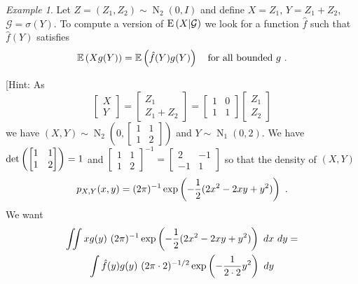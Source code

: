\documentclass[12pt,a4paper]{amsart}
\newcommand{\gaussian}[3]{\operatorname{N}_{#1}\left(#2,#3\right)}
\theoremstyle{plain}%
\theoremstyle{definition}
\theoremstyle{remark}
\newtheorem{example}{Example}
\begin{document}
\begin{example}
Let $Z = (Z_1,Z_2) \sim \gaussian 2 0 I$ and define $X = Z_1$, $Y = Z_1+ Z_2$, $\mathcal G = \sigma(Y)$. To compute a version of $\operatorname{E}\left(X \middle| \mathcal G\right)$ we look for a function $\hat f$ such that $\hat f(Y)$ satisfies
\begin{equation*}
  \expectof{X g(Y)} = \expectof{\hat f(Y) g(Y)} \quad \text{for all bounded $g$} \ .
\end{equation*}

[Hint: As 
\begin{equation*}
  \begin{bmatrix}
  X \\ Y
\end{bmatrix} =
\begin{bmatrix}
  Z_1 \\ Z_1 + Z_2
\end{bmatrix} =
\begin{bmatrix}
  1 & 0 \\ 1 & 1
\end{bmatrix}
\begin{bmatrix}
  Z_1 \\ Z_2
\end{bmatrix}
\end{equation*}
we have $(X,Y) \sim \gaussian 2 0 {
  \begin{bmatrix}
    1 & 1 \\ 1 & 2
  \end{bmatrix}}$
and $Y \sim \gaussian 1 0 2$. We have $\operatorname{det}\left( \begin{bmatrix}
    1 & 1 \\ 1 & 2
  \end{bmatrix}\right) = 1$ and $ \begin{bmatrix}
    1 & 1 \\ 1 & 2
  \end{bmatrix}^{-1} =
  \begin{bmatrix}
    2 & -1 \\ -1 & 1
  \end{bmatrix}$ so that the density of $(X,Y)$
  \begin{equation*}
    p_{X,Y}(x,y)=(2\pi)^{-1} \exp\left(-\frac12(2x^2 - 2xy + y^2)\right) \ .
  \end{equation*}
  We want
  \begin{multline*}
    \iint x g(y) \ (2\pi)^{-1} \expof{-\frac12(2x^2 - 2xy + y^2)} \ dx \ dy = \\  \int \hat f(y)g(y) \ (2\pi \cdot 2)^{-1/2} \expof{-\frac 1 {2 \cdot 2} y^2} \ dy 
  \end{multline*}

\end{example}
\end{document}
